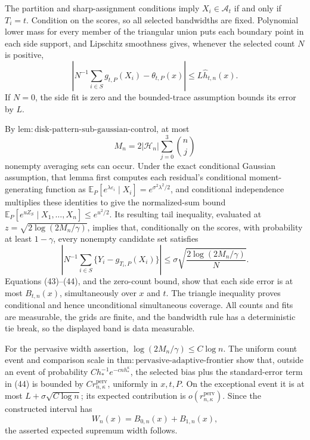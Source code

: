The partition and sharp-assignment conditions imply \(X_i\in\mathcal A_t\) if and only if \(T_i=t\).  Condition on the scores, so all selected bandwidths are fixed.  Polynomial lower mass for every member of the triangular union puts each boundary point in each side support, and Lipschitz smoothness gives, whenever the selected count \(N\) is positive,
\[
 \left|N^{-1}\sum_{i\in S}g_{t,P}(X_i)-\theta_{t,P}(x)\right|
 \le L\widehat h_{t,n}(x). \tag{43}
\]
If \(N=0\), the side fit is zero and the bounded-trace assumption bounds its error by \(L\).

By \(\mathrm{lem:disk\text{-}pattern\text{-}sub\text{-}gaussian\text{-}control}\), at most
\[
 M_n=2|\mathcal H_n|\sum_{j=0}^3\binom nj
\]
nonempty averaging sets can occur.  Under the exact conditional Gaussian assumption, that lemma first computes each residual's conditional moment-generating function as \(\mathbb E_P[e^{\lambda\varepsilon_i}\mid X_i]=e^{\sigma^2\lambda^2/2}\), and conditional independence multiplies these identities to give the normalized-sum bound \(\mathbb E_P[e^{uZ_S}\mid X_1,\ldots,X_n]\le e^{u^2/2}\).  Its resulting tail inequality, evaluated at \(z=\sqrt{2\log(2M_n/\gamma)}\), implies that, conditionally on the scores, with probability at least \(1-\gamma\), every nonempty candidate set satisfies
\[
 \left|N^{-1}\sum_{i\in S}\{Y_i-g_{T_i,P}(X_i)\}\right|
 \le\sigma\sqrt{\frac{2\log(2M_n/\gamma)}N}. \tag{44}
\]
Equations (43)--(44), and the zero-count bound, show that each side error is at most \(B_{t,n}(x)\), simultaneously over \(x\) and \(t\).  The triangle inequality proves conditional and hence unconditional simultaneous coverage.  All counts and fits are measurable, the grids are finite, and the bandwidth rule has a deterministic tie break, so the displayed band is data measurable.

For the pervasive width assertion, \(\log(2M_n/\gamma)\le C\log n\).  The uniform count event and comparison scale in \(\mathrm{thm:pervasive\text{-}adaptive\text{-}frontier}\) show that, outside an event of probability \(Ch_*^{-1}e^{-cnh_*^{\kappa}}\), the selected bias plus the standard-error term in (44) is bounded by \(Cr_{n,\kappa}^{\mathrm{perv}}\), uniformly in \(x,t,P\).  On the exceptional event it is at most \(L+\sigma\sqrt{C\log n}\); its expected contribution is \(o(r_{n,\kappa}^{\mathrm{perv}})\).  Since the constructed interval has
\[
 W_n(x)=B_{0,n}(x)+B_{1,n}(x),
\]
the asserted expected supremum width follows.

